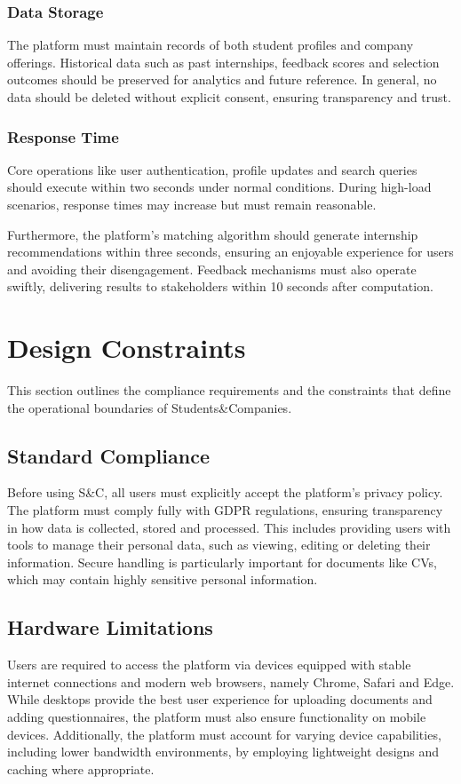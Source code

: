 \subsubsection{Data Storage}
The platform must maintain records of both student profiles and company offerings.
Historical data such as past internships, feedback scores and selection outcomes should be preserved for analytics and future reference.
In general, no data should be deleted without explicit consent, ensuring transparency and trust.

\subsubsection{Response Time}
Core operations like user authentication, profile updates and search queries should execute within two seconds under normal conditions.
During high-load scenarios, response times may increase but must remain reasonable.

Furthermore, the platform's matching algorithm should generate internship recommendations within three seconds, ensuring an enjoyable experience for users and avoiding their disengagement.
Feedback mechanisms must also operate swiftly, delivering results to stakeholders within 10 seconds after computation.

\section{Design Constraints}
This section outlines the compliance requirements and the constraints that define the operational boundaries of Students\&Companies.

\subsection{Standard Compliance}
Before using S\&C, all users must explicitly accept the platform's privacy policy.
The platform must comply fully with GDPR regulations, ensuring transparency in how data is collected, stored and processed.
This includes providing users with tools to manage their personal data, such as viewing, editing or deleting their information.
Secure handling is particularly important for documents like CVs, which may contain highly sensitive personal information.

\subsection{Hardware Limitations}
Users are required to access the platform via devices equipped with stable internet connections and modern web browsers, namely Chrome, Safari and Edge.
While desktops provide the best user experience for uploading documents and adding questionnaires, the platform must also ensure functionality on mobile devices.
Additionally, the platform must account for varying device capabilities, including lower bandwidth environments, by employing lightweight designs and caching where appropriate.

